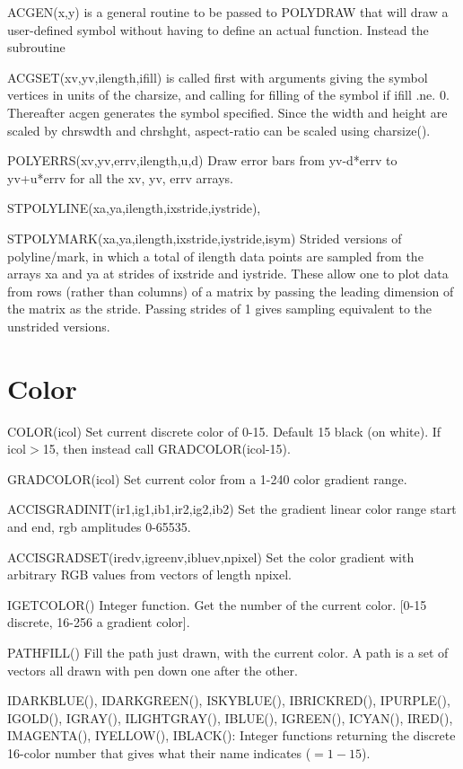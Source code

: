 \documentclass[12pt]{article}
\newif \iftth
\begin{document}
ACGEN(x,y) is a general routine to be passed to POLYDRAW that will draw a
user-defined symbol without having to define an actual
function. Instead the subroutine 

ACGSET(xv,yv,ilength,ifill) is called
first with arguments giving the symbol vertices in units of the
charsize, and calling for filling of the symbol if ifill .ne. 0.
Thereafter acgen generates the symbol specified. Since the width and
height are scaled by chrswdth and chrshght, aspect-ratio can be scaled
using charsize().

POLYERRS(xv,yv,errv,ilength,u,d) Draw error bars from yv-d*errv to
yv+u*errv for all the xv, yv, errv arrays.

STPOLYLINE(xa,ya,ilength,ixstride,iystride),

STPOLYMARK(xa,ya,ilength,ixstride,iystride,isym) Strided versions of
polyline/mark, in which a total of ilength data points are sampled
from the arrays xa and ya at strides of ixstride and iystride. These
allow one to plot data from rows (rather than columns) of a matrix by
passing the leading dimension of the matrix as the stride. Passing
strides of 1 gives sampling equivalent to the unstrided versions.

\section{Color}

\iftth \special{html:<a href="filltest.f"><img align="right" src="filltest.png"></a>}\fi
COLOR(icol) Set current discrete color of 0-15. Default 15 black (on
white). If icol$>$15, then instead call GRADCOLOR(icol-15).

GRADCOLOR(icol) Set current color from a 1-240 color gradient range.

ACCISGRADINIT(ir1,ig1,ib1,ir2,ig2,ib2) Set the gradient linear color
range start and end, rgb amplitudes 0-65535.

ACCISGRADSET(iredv,igreenv,ibluev,npixel) Set the color gradient with
arbitrary RGB values from vectors of length npixel.

IGETCOLOR() Integer function.  Get the number of the current
color. [0-15 discrete, 16-256 a gradient color].

PATHFILL() Fill the path just drawn, with the current color. A path is
a set of vectors all drawn with pen down one after the other.

IDARKBLUE(), IDARKGREEN(),  ISKYBLUE(),  IBRICKRED(),  IPURPLE(),
IGOLD(),  IGRAY(),  ILIGHTGRAY(),  IBLUE(),  IGREEN(),  ICYAN(),
IRED(),  IMAGENTA(),  IYELLOW(),  IBLACK(): Integer functions returning
the discrete 16-color number that gives what their name indicates ($=1-15$).
\end{document}
